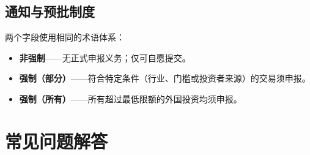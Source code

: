 \documentclass[12pt,a4paper]{article}
\begin{document}
\subsection{通知与预批制度}

两个字段使用相同的术语体系：
\begin{itemize}
  \item \textbf{非强制}——无正式申报义务；仅可自愿提交。
  \item \textbf{强制（部分）}——符合特定条件（行业、门槛或投资者来源）的交易须申报。
  \item \textbf{强制（所有）}——所有超过最低限额的外国投资均须申报。
\end{itemize}

\section{常见问题解答}
\label{sec:faq}
\end{document}
